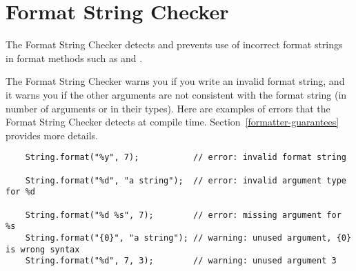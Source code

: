 \htmlhr
\chapter{Format String Checker\label{formatter-checker}}

The Format String Checker detects and prevents use of incorrect format strings
in format methods such as 
and .

The Format String Checker warns you if you write an invalid format string,
and it warns you if the other arguments are not consistent with the format
string (in number of arguments or in their types).  Here are examples of
errors that the Format String Checker detects at compile time.
Section~\ref{formatter-guarantees} provides more details.



% 
%

\begin{Verbatim}
    String.format("%y", 7);           // error: invalid format string

    String.format("%d", "a string");  // error: invalid argument type for %d

    String.format("%d %s", 7);        // error: missing argument for %s
    String.format("{0}", "a string"); // warning: unused argument, {0} is wrong syntax
    String.format("%d", 7, 3);        // warning: unused argument 3
\end{Verbatim}


